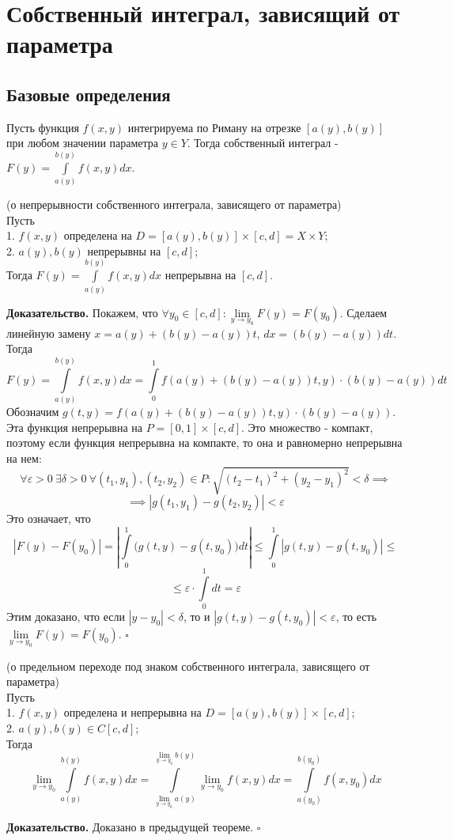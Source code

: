 \section{Собственный интеграл, зависящий от параметра}
\subsection{Базовые определения}
\begin{defin}
    Пусть функция $f(x,y)$ интегрируема по Риману на отрезке $[a(y),b(y)]$
    при любом значении параметра  $y\in Y$. Тогда собственный интеграл - 
    $F(y)=\int\limits_{a(y)}^{b(y)}f(x,y)dx$.
\end{defin}

\begin{theor}
    (о непрерывности собственного интеграла, зависящего от параметра)\\
    Пусть\\
    1. $f(x,y)$ определена на  $D=[a(y),b(y)]\times [c,d]=X\times Y$;\\
    2. $a(y),b(y)$ непрерывны на  $[c,d]$;\\
    Тогда $F(y)=\int\limits_{a(y)}^{b(y)}f(x,y)dx$ непрерывна на $[c,d]$.
\end{theor}
\textbf{Доказательство.} Покажем, что $\forall y_0\in [c,d]:
\lim\limits_{y \to y_0}F(y)=F(y_0)$. Сделаем линейную замену
$x=a(y)+(b(y)-a(y))t$, $dx=(b(y)-a(y))dt$. Тогда
$$F(y)=\int\limits_{a(y)}^{b(y)}f(x,y)dx=\int\limits_{0}^{1}
f(a(y)+(b(y)-a(y))t,y)\cdot (b(y)-a(y))dt$$
Обозначим $g(t,y)=f(a(y)+(b(y)-a(y))t,y)\cdot (b(y)-a(y))$. Эта функция 
непрерывна на $P=[0,1]\times [c,d]$. Это множество - компакт, поэтому если 
функция непрерывна на компакте, то она и равномерно непрерывна на нем:
$$\forall \varepsilon>0~\exists \delta>0~\forall (t_1,y_1),(t_2,y_2)\in P:
\sqrt{(t_2-t_1)^2+(y_2-y_1)^2}<\delta\implies $$
$$\implies |g(t_1,y_1)-g(t_2,y_2)|<\varepsilon$$ 
Это означает, что
$$|F(y)-F(y_0)|=\left| \int\limits_{0}^{1}\big(g(t,y)-g(t,y_0)\big)dt\right|
\leqslant \int\limits_{0}^{1}|g(t,y)-g(t,y_0)|\leqslant 
$$
$$\leqslant \varepsilon\cdot \int\limits_{0}^{1}dt=\varepsilon$$
Этим доказано, что если $|y-y_0|<\delta$, то и $|g(t,y)-g(t,y_0)|<
\varepsilon$, то есть $\lim\limits_{y \to y_0}F(y)=F(y_0)$. $\square$ 

\begin{theor}
    (о предельном переходе под знаком собственного интеграла, зависящего от 
    параметра)\\
    Пусть\\
    1. $f(x,y)$ определена и непрерывна на  $D=[a(y),b(y)]\times [c,d]$;\\
    2. $a(y),b(y)\in C[c,d]$;\\
    Тогда 
    $$\lim\limits_{y \to y_0}\int\limits_{a(y)}^{b(y)}f(x,y)dx=
    \int\limits_{\lim\limits_{y \to y_0}a(y) }^{\lim\limits_{y \to y_0}b(y)}
   \lim\limits_{y \to y_0}f(x,y)dx=\int\limits_{a(y_0)}^{b(y_0)}f(x,y_0)dx$$
\end{theor}
\textbf{Доказательство.}  Доказано в предыдущей теореме. $\square$

